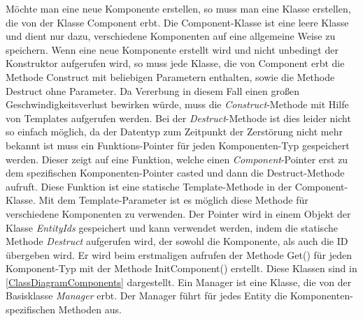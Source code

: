 Möchte man eine neue Komponente erstellen, so muss man eine Klasse erstellen, die von der Klasse Component erbt. Die Component-Klasse ist eine leere Klasse und dient nur dazu, verschiedene Komponenten auf eine allgemeine Weise zu speichern.  %
Wenn eine neue Komponente erstellt wird und nicht unbedingt der Konstruktor aufgerufen wird, so muss jede Klasse, die von Component erbt die Methode Construct mit beliebigen Parametern enthalten, sowie die Methode Destruct ohne Parameter. %
Da Vererbung in diesem Fall einen großen Geschwindigkeitsverlust bewirken würde, muss die \textit{Construct}-Methode mit Hilfe von Templates aufgerufen werden. Bei der \textit{Destruct}-Methode ist dies leider nicht so einfach möglich, da der Datentyp zum Zeitpunkt der Zerstörung nicht mehr bekannt ist muss ein Funktions-Pointer für jeden Komponenten-Typ gespeichert werden. Dieser zeigt auf eine Funktion, welche einen \textit{Component}-Pointer erst zu dem spezifischen Komponenten-Pointer casted und dann die Destruct-Methode aufruft. Diese Funktion ist eine statische Template-Methode in der Component-Klasse. Mit dem Template-Parameter ist es möglich diese Methode für verschiedene Komponenten zu verwenden. Der Pointer wird in einem Objekt der Klasse \textit{EntityIds} gespeichert und kann verwendet werden, indem die statische Methode \textit{Destruct} aufgerufen wird, der sowohl die Komponente, als auch die ID übergeben wird. 
Er wird beim erstmaligen aufrufen der Methode Get() für jeden Komponent-Typ mit der Methode InitComponent() erstellt. Diese Klassen sind in \cref{ClassDiagramComponents} dargestellt.
Ein Manager ist eine Klasse, die von der Basisklasse \textit{Manager} erbt. Der Manager führt für jedes Entity die Komponenten-spezifischen Methoden aus.
